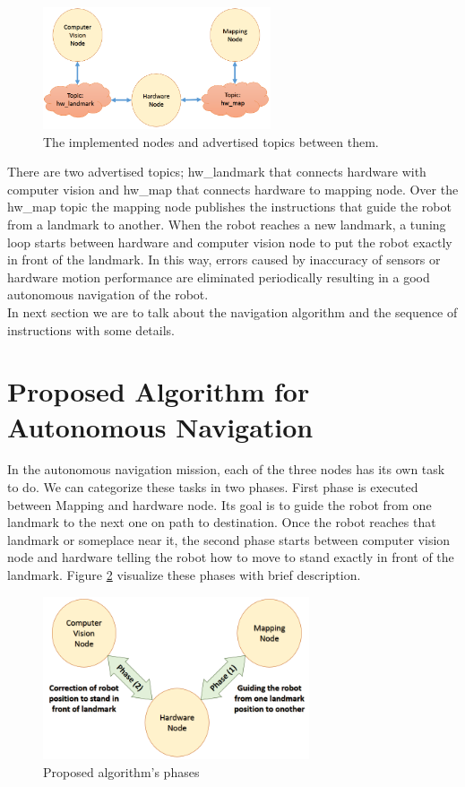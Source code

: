 \documentclass[12pt]{book}
\begin{document}
\begin{figure}
	\centering
	\includegraphics[width =0.6\textwidth]{Fig/Project-Nodes.png}
	\caption{The implemented nodes and advertised topics between them.}
	\label{fig:nodes}
\end{figure}

\noindent There are two advertised topics; hw\_landmark that connects hardware with computer vision and hw\_map that connects hardware to mapping node. Over the hw\_map topic the mapping node publishes the instructions that guide the robot from a landmark to another. When the robot reaches a new landmark, a tuning loop starts between hardware and computer vision node to put the robot exactly in front of the landmark. In this way, errors caused by inaccuracy of sensors or hardware motion performance are eliminated periodically resulting in a good autonomous navigation of the robot.\\
In next section we are to talk about the navigation algorithm and the sequence of instructions with some details.  




\section{Proposed Algorithm for Autonomous Navigation}
In the autonomous navigation mission, each of the three nodes has its own task to do. We can categorize these tasks in two phases. First phase is executed between Mapping and hardware node. Its goal is to guide the robot from one landmark to the next one on path to destination. Once the robot reaches that landmark or someplace near it, the second phase starts between computer vision node and hardware telling the robot how to move to stand exactly in front of the landmark. Figure \ref{fig:algorithm-phases} visualize these phases with brief description.

\begin{figure}
	\centering
	\includegraphics[width=0.7\textwidth]{Fig/Algorithm-phases.png}
	\caption{Proposed algorithm's phases}
	\label{fig:algorithm-phases}
\end{figure}
\end{document}

